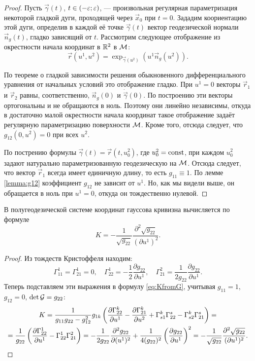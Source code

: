 \begin{proof}
	Пусть $\vec{\gamma}(t)$, $t \in (-\varepsilon; \varepsilon)$, --- произвольная регулярная параметризация некоторой гладкой дуги, проходящей через $\vec{x}_0$ при $t = 0$. Зададим коориентацию этой дуги, определив в каждой её точке $\vec{\gamma}(t)$ вектор геодезической нормали $\vec{n}_g(t)$, гладко зависящий от $t$. Рассмотрим следующее отображение из окрестности начала координат в $\mathbb{R}^2$ в $\mathcal{M}$:
	\[
		\vec{r}(u^1, u^2) = \exp_{\vec{\gamma}(u^2)}(u^1\vec{n}_g(u^2)).
	\]

	По теореме о гладкой зависимости решения обыкновенного дифференциального уравнения от начальных условий это отображение гладко. При $u^1 = 0$ векторы $\vec{r}_1$ и $\vec{r}_2$ равны, соответственно, $\vec{n}_g(0)$ и $\dot{\vec{\gamma}}(0)$. По построению эти векторы ортогональны и не обращаются в ноль. Поэтому они линейно независимы, откуда в достаточно малой окрестности начала координат такое отображение задаёт регулярную параметризацию поверхности $\mathcal{M}$. Кроме того, отсюда следует, что $g_{12}(0, u^2) = 0$ при всех $u^2$.

	По пострению формулы $\vec{\gamma}(t) = \vec{r}(t, u_0^2)$, где $u_0^2 = \mathrm{const}$, при каждом $u_0^2$ задают натурально параметризованную геодезическую на $\mathcal{M}$. Отсюда следует, что вектор $\vec{r}_1$ всегда имеет единичную длину, то есть $g_{11} \equiv 1$. По лемме \ref{lemma:g12} коэффициент $g_{12}$ не зависит от $u^1$. Но, как мы видели выше, он обращается в ноль при $u^1 = 0$, откуда он тождественно нулевой.
\end{proof}

\begin{lemma} \label{lemma:GeoK}
	В полугеодезической системе координат гауссова кривизна вычисляется по формуле
	\begin{equation} \label{eq:GeoK}
		K = -\frac{1}{\sqrt{g_{22}}}\frac{\partial^2\sqrt{g_{22}}}{(\partial u^1)^2}.
	\end{equation}
\end{lemma}

\begin{proof}
	Из тождеств Кристоффеля находим:
	\[
		\Gamma_{11}^1 = \Gamma_{21}^1 = 0,\quad\Gamma_{22}^1 = -\frac{1}{2}\frac{\partial g_{22}}{\partial u^1},\quad\Gamma_{21}^2 = \frac{1}{2g_{22}}\frac{\partial g_{22}}{\partial u^1}.
	\]
	Теперь подставляем эти выражения в формулу \eqref{eq:KfromG}, учитывая $g_{11} = 1$, $g_{12} = 0$, $\det\mathcal{G} = g_{22}$:
	\begin{multline*}
		K = \frac{1}{g_{11}g_{22} - g_{12}^2}g_{1k}\left(\frac{\partial\Gamma^k_{22}}{\partial u^1} - \frac{\partial\Gamma_{21}^k}{\partial u^2} + \Gamma_{s1}^k\Gamma^s_{22} - \Gamma_{s2}^k\Gamma_{21}^s\right) =\\ = \frac{1}{g_{22}}\left(\frac{\partial\Gamma_{22}^1}{\partial u^1} - \Gamma_{22}^1\Gamma_{21}^2\right) = -\frac{1}{2g_{22}}\frac{\partial^2g_{22}}{\partial (u^1)^2} + \frac{1}{4(g_{22})^2}\left(\frac{\partial g_{22}}{\partial u^1}\right)^2 = -\frac{1}{\sqrt{g_{22}}}\frac{\partial^2\sqrt{g_{22}}}{(\partial u^1)^2}.
	\end{multline*}
\end{proof}

